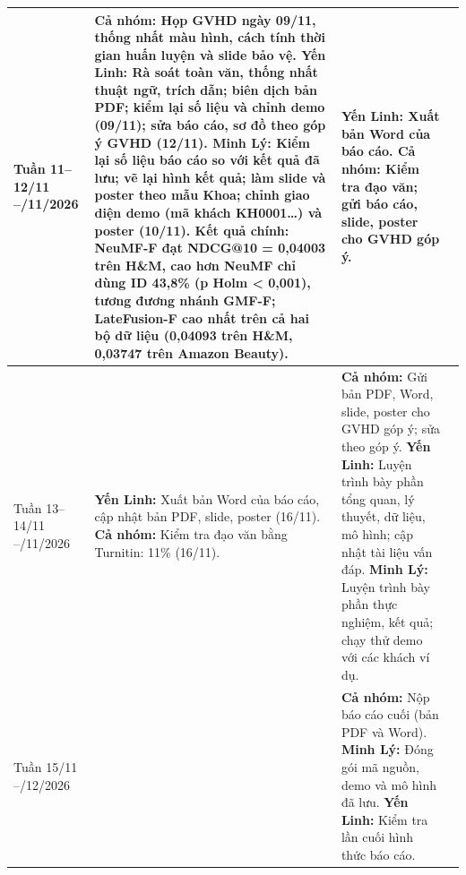 \documentclass[12pt]{extarticle}
\newcommand{\YL}{\textbf{Yến Linh:} }
\newcommand{\ML}{\textbf{Minh Lý:} }
\newcommand{\CN}{\textbf{Cả nhóm:} }
\begin{document}
\begin{longtable}{|C{2.4cm}|L{5.1cm}|L{4.6cm}|C{2.1cm}|}
Tuần 11–12/11 –/11/2026 &
\CN Họp GVHD ngày 09/11, thống nhất màu hình, cách tính thời gian huấn luyện và slide bảo vệ.\newline
\YL Rà soát toàn văn, thống nhất thuật ngữ, trích dẫn; biên dịch bản PDF; kiểm lại số liệu và chỉnh demo (09/11); sửa báo cáo, sơ đồ theo góp ý GVHD (12/11).\newline
\ML Kiểm lại số liệu báo cáo so với kết quả đã lưu; vẽ lại hình kết quả; làm slide và poster theo mẫu Khoa; chỉnh giao diện demo (mã khách KH0001…) và poster (10/11).\newline
\textbf{Kết quả chính:} NeuMF-F đạt NDCG@10 = 0,04003 trên H\&M, cao hơn NeuMF chỉ dùng ID 43,8\% (p Holm < 0,001), tương đương nhánh GMF-F; LateFusion-F cao nhất trên cả hai bộ dữ liệu (0,04093 trên H\&M, 0,03747 trên Amazon Beauty). &
\YL Xuất bản Word của báo cáo.\newline
\CN Kiểm tra đạo văn; gửi báo cáo, slide, poster cho GVHD góp ý. & \\ \hline

Tuần 13–14/11 –/11/2026 &
\YL Xuất bản Word của báo cáo, cập nhật bản PDF, slide, poster (16/11).\newline
\CN Kiểm tra đạo văn bằng Turnitin: 11\% (16/11). &
\CN Gửi bản PDF, Word, slide, poster cho GVHD góp ý; sửa theo góp ý.\newline
\YL Luyện trình bày phần tổng quan, lý thuyết, dữ liệu, mô hình; cập nhật tài liệu vấn đáp.\newline
\ML Luyện trình bày phần thực nghiệm, kết quả; chạy thử demo với các khách ví dụ. & \\ \hline

Tuần 15/11 –/12/2026 & &
\CN Nộp báo cáo cuối (bản PDF và Word).\newline
\ML Đóng gói mã nguồn, demo và mô hình đã lưu.\newline
\YL Kiểm tra lần cuối hình thức báo cáo. & \\ \hline
\end{longtable}
\end{document}
